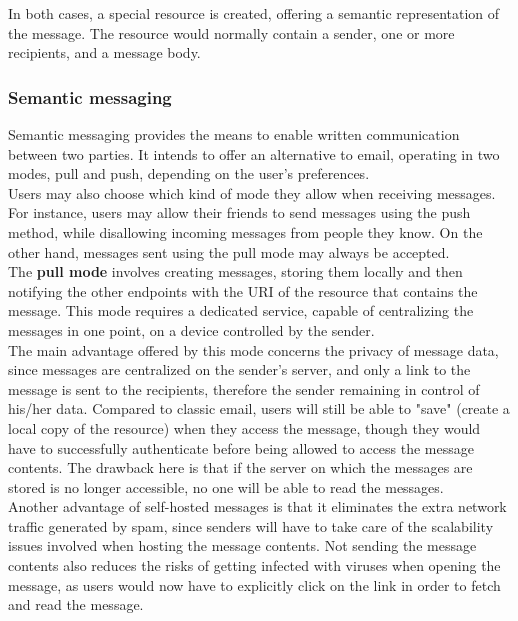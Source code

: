 In both cases, a special resource is created, offering a semantic representation of the message. The resource would normally contain a sender, one or more recipients, and a message body.

\subsubsection{Semantic messaging}
\label{subsubsec:messaging}
Semantic messaging provides the means to enable written communication between two parties. It intends to offer an alternative to email, operating in two modes, pull and push, depending on the user's preferences.\\

Users may also choose which kind of mode they allow when receiving messages. For instance, users may allow their friends to send messages using the push method, while disallowing incoming messages from people they know. On the other hand, messages sent using the pull mode may always be accepted.\\

The \textbf{pull mode} involves creating messages, storing them locally and then notifying the other endpoints with the URI of the resource that contains the message. This mode requires a dedicated service, capable of centralizing the messages in one point, on a device controlled by the sender.\\

The main advantage offered by this mode concerns the privacy of message data, since messages are centralized on the sender's server, and only a link to the message is sent to the recipients, therefore the sender remaining in control of his/her data. Compared to classic email, users will still be able to "save" (create a local copy of the resource) when they access the message, though they would have to successfully authenticate before being allowed to access the message contents. The drawback here is that if the server on which the messages are stored is no longer accessible, no one will be able to read the messages.\\

Another advantage of self-hosted messages is that it eliminates the extra network traffic generated by spam, since senders will have to take care of the scalability issues involved when hosting the message contents. Not sending the message contents also reduces the risks of getting infected with viruses when opening the message, as users would now have to explicitly click on the link in order to fetch and read the message.\\

